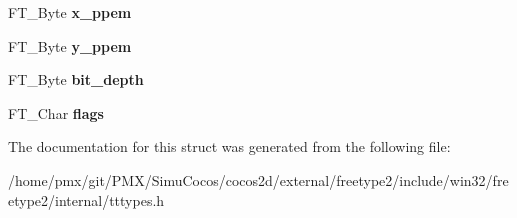\begin{DoxyCompactItemize}
F\+T\+\_\+\+Byte {\bfseries x\+\_\+ppem}
\item 
\mbox{\label{structTT__SBit__StrikeRec___ad618814b841b86e7763f1aa371e04fed}} 
F\+T\+\_\+\+Byte {\bfseries y\+\_\+ppem}
\item 
\mbox{\label{structTT__SBit__StrikeRec___ac57b360af4620bd06251d098f5da23bb}} 
F\+T\+\_\+\+Byte {\bfseries bit\+\_\+depth}
\item 
\mbox{\label{structTT__SBit__StrikeRec___a38735f8c00b23deb25ffab798c0aa7b7}} 
F\+T\+\_\+\+Char {\bfseries flags}
\end{DoxyCompactItemize}


The documentation for this struct was generated from the following file\+:\begin{DoxyCompactItemize}
\item 
/home/pmx/git/\+P\+M\+X/\+Simu\+Cocos/cocos2d/external/freetype2/include/win32/freetype2/internal/tttypes.\+h\end{DoxyCompactItemize}

